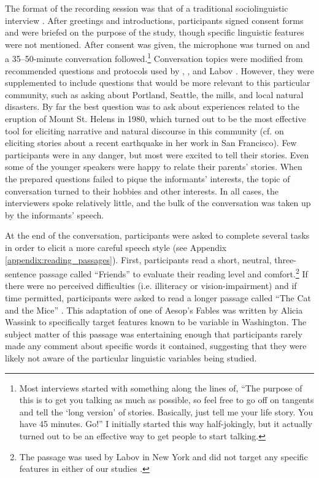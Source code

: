 The format of the recording session was that of a traditional sociolinguistic interview \citep{labov_1984}. After greetings and introductions, participants signed consent forms and were briefed on the purpose of the study, though specific linguistic features were not mentioned. After consent was given, the microphone was turned on and a 35--50-minute conversation followed.\footnote{Most interviews started with something along the lines of, ``The purpose of this is to get you talking as much as possible, so feel free to go off on tangents and tell the `long version' of stories. Basically, just tell me your life story. You have 45 minutes. Go!'' I initially started this way half-jokingly, but it actually turned out to be an effective way to get people to start talking.} Conversation topics were modified from recommended questions and protocols used by \citet{wolfram_1974}, \citet{tagliamonte_2006}, and Labov \citep{labov_1998_2004, labov_1984}. However, they were supplemented to include questions that would be more relevant to this particular community, such as asking about Portland, Seattle, the mills, and local natural disasters. By far the best question was to ask about experiences related to the eruption of Mount St. Helens in 1980, which turned out to be the most effective tool for eliciting narrative and natural discourse in this community (cf. \citealt[92]{moonwomon_1991_diss} on eliciting stories about a recent earthquake in her work in San Francisco). Few participants were in any danger, but most were excited to tell their stories. Even some of the younger speakers were happy to relate their parents' stories. When the prepared questions failed to pique the informants' interests, the topic of conversation turned to their hobbies and other interests. In all cases, the interviewers spoke relatively little, and the bulk of the conversation was taken up by the informants' speech.

At the end of the conversation, participants were asked to complete several tasks in order to elicit a more careful speech style (see Appendix \ref{appendix:reading_passages}). First, participants read a short, neutral, three-sentence passage called ``Friends'' to evaluate their reading level and comfort.\footnote{The passage was used by Labov in New York and did not target any specific features in either of our studies \citep[417]{labov_2006}.} If there were no perceived difficulties (i.e. illiteracy or vision-impairment) and if time permitted, participants were asked to read a longer passage called ``The Cat and the Mice'' \citep{freeman_2014}. This adaptation of one of Aesop's Fables was written by Alicia Wassink to specifically target features known to be variable in Washington. The subject matter of this passage was entertaining enough that participants rarely made any comment about specific words it contained, suggesting that they were likely not aware of the particular linguistic variables being studied.

